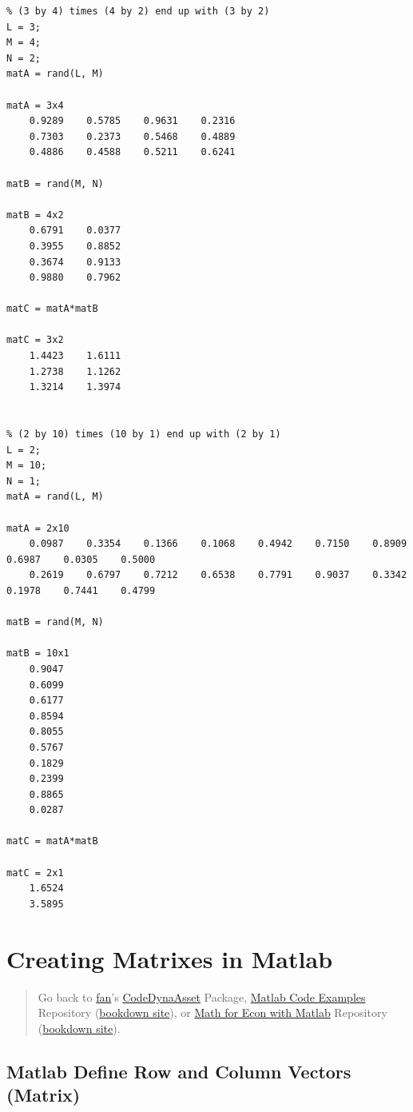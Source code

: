 \documentclass[
]{book}
\begin{document}
\begin{verbatim}
% (3 by 4) times (4 by 2) end up with (3 by 2)
L = 3;
M = 4;
N = 2;
matA = rand(L, M)

matA = 3x4    
    0.9289    0.5785    0.9631    0.2316
    0.7303    0.2373    0.5468    0.4889
    0.4886    0.4588    0.5211    0.6241

matB = rand(M, N)  

matB = 4x2    
    0.6791    0.0377
    0.3955    0.8852
    0.3674    0.9133
    0.9880    0.7962

matC = matA*matB

matC = 3x2    
    1.4423    1.6111
    1.2738    1.1262
    1.3214    1.3974


% (2 by 10) times (10 by 1) end up with (2 by 1)
L = 2;
M = 10;
N = 1;
matA = rand(L, M)

matA = 2x10    
    0.0987    0.3354    0.1366    0.1068    0.4942    0.7150    0.8909    0.6987    0.0305    0.5000
    0.2619    0.6797    0.7212    0.6538    0.7791    0.9037    0.3342    0.1978    0.7441    0.4799

matB = rand(M, N)  

matB = 10x1    
    0.9047
    0.6099
    0.6177
    0.8594
    0.8055
    0.5767
    0.1829
    0.2399
    0.8865
    0.0287

matC = matA*matB

matC = 2x1    
    1.6524
    3.5895
\end{verbatim}

\hypertarget{creating-matrixes-in-matlab}{%
\section{Creating Matrixes in Matlab}\label{creating-matrixes-in-matlab}}

\begin{quote}
Go back to \href{http://fanwangecon.github.io/}{fan}'s \href{https://fanwangecon.github.io/CodeDynaAsset/}{CodeDynaAsset} Package, \href{https://fanwangecon.github.io/M4Econ/}{Matlab Code Examples} Repository (\href{https://fanwangecon.github.io/M4Econ/bookdown}{bookdown site}), or \href{https://fanwangecon.github.io/Math4Econ/}{Math for Econ with Matlab} Repository (\href{https://fanwangecon.github.io/Math4Econ/bookdown}{bookdown site}).
\end{quote}

\hypertarget{matlab-define-row-and-column-vectors-matrix}{%
\subsection{Matlab Define Row and Column Vectors (Matrix)}\label{matlab-define-row-and-column-vectors-matrix}}
\end{document}
